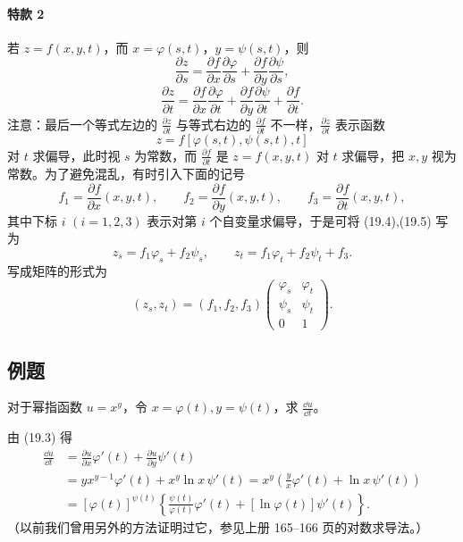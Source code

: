 \paragraph{特款 2}
若 $z=f(x,y,t)$，而 $x=\varphi(s,t)$，$y=\psi(s,t)$，则
\begin{equation}
  \frac{\partial z}{\partial s}
  =\frac{\partial f}{\partial x}\frac{\partial\varphi}{\partial s}
  +\frac{\partial f}{\partial y}\frac{\partial\psi}{\partial s},
  \tag{19.4}
  \label{eq:19.4}
\end{equation}
\begin{equation}
  \frac{\partial z}{\partial t}
  =\frac{\partial f}{\partial x}\frac{\partial\varphi}{\partial t}
  +\frac{\partial f}{\partial y}\frac{\partial\psi}{\partial t}
  +\frac{\partial f}{\partial t}.
  \tag{19.5}
  \label{eq:19.5}
\end{equation}
注意：最后一个等式左边的 $\frac{\partial z}{\partial t}$ 与等式右边的 $\frac{\partial f}{\partial t}$ 不一样，$\frac{\partial z}{\partial t}$ 表示函数
\[
  z=f[\varphi(s,t),\psi(s,t),t]
\]
对 $t$ 求偏导，此时视 $s$ 为常数，而 $\frac{\partial f}{\partial t}$ 是 $z=f(x,y,t)$ 对 $t$ 求偏导，把 $x,y$ 视为常数。为了避免混乱，有时引入下面的记号
\[
  f_1=\frac{\partial f}{\partial x}(x,y,t),\qquad
  f_2=\frac{\partial f}{\partial y}(x,y,t),\qquad
  f_3=\frac{\partial f}{\partial t}(x,y,t),
\]
其中下标 $i$ $(i=1,2,3)$ 表示对第 $i$ 个自变量求偏导，于是可将 (19.4),(19.5) 写为
\[
  z_s=f_1\varphi_s+f_2\psi_s,\qquad
  z_t=f_1\varphi_t+f_2\psi_t+f_3.
\]
写成矩阵的形式为
\[
  (z_s,z_t)=(f_1,f_2,f_3)
  \begin{pmatrix}
    \varphi_s & \varphi_t\\
    \psi_s & \psi_t\\
    0 & 1
  \end{pmatrix}.
\]

\subsection{例题}

\begin{xexample}[19.3.1]
对于幂指函数 $u=x^y$，令 $x=\varphi(t),y=\psi(t)$，求 $\frac{\dd u}{\dd t}$。
\end{xexample}
\begin{xsolution}
由 (19.3) 得
\begin{align*}
  \frac{\dd u}{\dd t}
  &=\frac{\partial u}{\partial x}\varphi'(t)+\frac{\partial u}{\partial y}\psi'(t)\\
  &=yx^{y-1}\varphi'(t)+x^y\ln x\,\psi'(t)
   =x^y\left(\frac{y}{x}\varphi'(t)+\ln x\,\psi'(t)\right)\\
  &=[\varphi(t)]^{\psi(t)}\left\{\frac{\psi(t)}{\varphi(t)}\varphi'(t)+[\ln\varphi(t)]\psi'(t)\right\}.
\end{align*}
（以前我们曾用另外的方法证明过它，参见上册 165--166 页的对数求导法。）
\end{xsolution}

